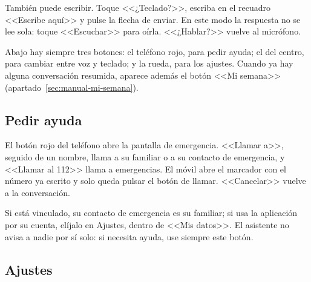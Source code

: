 También puede escribir. Toque <<¿Teclado?>>, escriba en el recuadro <<Escribe aquí>> y pulse la flecha de enviar. En este modo la respuesta no se lee sola: toque <<Escuchar>> para oírla. <<¿Hablar?>> vuelve al micrófono.

Abajo hay siempre tres botones: el teléfono rojo, para pedir ayuda; el del centro, para cambiar entre voz y teclado; y la rueda, para los ajustes. Cuando ya hay alguna conversación resumida, aparece además el botón <<Mi semana>> (apartado~\ref{sec:manual-mi-semana}).

\subsection{Pedir ayuda}

El botón rojo del teléfono abre la pantalla de emergencia. <<Llamar a>>, seguido de un nombre, llama a su familiar o a su contacto de emergencia, y <<Llamar al 112>> llama a emergencias. El móvil abre el marcador con el número ya escrito y solo queda pulsar el botón de llamar. <<Cancelar>> vuelve a la conversación.

Si está vinculado, su contacto de emergencia es su familiar; si usa la aplicación por su cuenta, elíjalo en Ajustes, dentro de <<Mis datos>>. El asistente no avisa a nadie por sí solo: si necesita ayuda, use siempre este botón.

\subsection{Ajustes}

